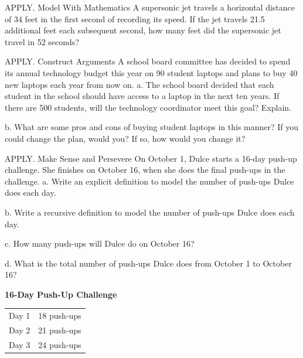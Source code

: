 \documentclass{article}
\newenvironment{practice}[2]{}{}        %
\newcommand{\answer}[1]{}               %
\newcommand{\placeholder}[2]{}          %
\begin{document}
\begin{practice}{33}{2}
APPLY. Model With Mathematics A supersonic jet travels a horizontal distance of 34 feet in the first second of recording its speed. If the jet travels 21.5 additional feet each subsequent second, how many feet did the supersonic jet travel in 52 seconds?
\answer{30,277 ft}
\end{practice}
\begin{practice}{34}{2}
APPLY. Construct Arguments A school board committee has decided to spend its annual technology budget this year on 90 student laptops and plans to buy 40 new laptops each year from now on.
a. The school board decided that each student in the school should have access to a laptop in the next ten years. If there are 500 students, will the technology coordinator meet this goal? Explain.
\answer{a. No; there will be a total of only 450 laptops.}
b. What are some pros and cons of buying student laptops in this manner? If you could change the plan, would you? If so, how would you change it?
\answer{b. Answers may vary. Sample: Cons: Ones purchased in the first year may break before all students have one. Pros: Spread out the cost. One way to improve this plan would be to buy 95 laptops the first year and 45 new laptops each year after that, so that all 500 students will have a laptop after 10 years.}
\end{practice}
\begin{practice}{35}{2}
APPLY. Make Sense and Persevere On October 1, Dulce starts a 16-day push-up challenge. She finishes on October 16, when she does the final push-ups in the challenge.
a. Write an explicit definition to model the number of push-ups Dulce does each day.
\answer{a. (a_n=18+3(n-1))}
b. Write a recursive definition to model the number of push-ups Dulce does each day.
\answer{b. (a_1=18); (a_n=a_{n-1}+3)}
c. How many push-ups will Dulce do on October 16?
\answer{c. 63 push-ups}
d. What is the total number of push-ups Dulce does from October 1 to October 16?
\answer{d. 648 push-ups}
\textbf{16-Day Push-Up Challenge}
\begin{tabular}{ll}
Day 1 & 18 push-ups \\
Day 2 & 21 push-ups \\
Day 3 & 24 push-ups \\
\end{tabular}
\placeholder{illustration}{Woman doing a push-up on a green mat, with blue wall and dumbbell rack in background; challenge table above her at left is transcribed separately.}
\end{practice}
\end{document}
